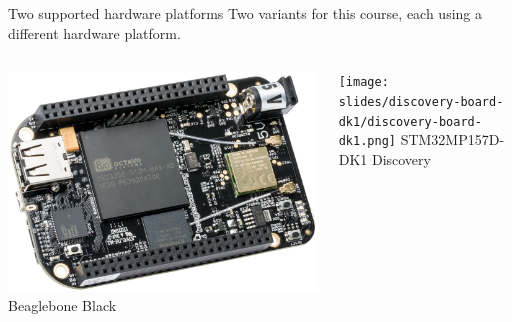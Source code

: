 \begin{frame}{Two supported hardware platforms}
  Two variants for this course, each using a different hardware
  platform.  \vfill
  \begin{columns}
    \begin{center}
      \includegraphics[height=0.4\textheight]{slides/beagleboneblack-board/beagleboneblack.png}
      \newline
      Beaglebone Black
    \end{center}
    \begin{center}
      \texttt{[image: slides/discovery-board-dk1/discovery-board-dk1.png]}
      \newline
      STM32MP157D-DK1 Discovery
    \end{center}
  \end{columns}
\end{frame}

